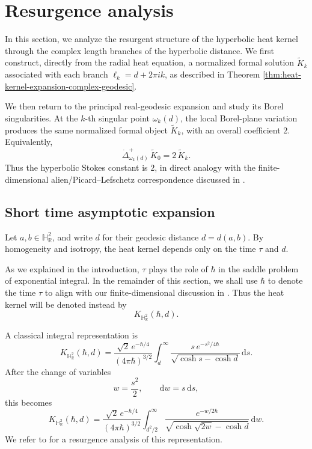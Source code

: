 \documentclass[11pt]{amsart}
\theoremstyle{plain}
\theoremstyle{definition}
\newcommand{\R}{\mathbb{R}}
\newcommand{\dd}{\mathrm d}
\newcommand{\HH}{\mathbb{H}}
\begin{document}
\section{Resurgence analysis}\label{sec:H^2-resurgence}


In this section, we analyze the resurgent structure of the hyperbolic heat kernel
through the complex length branches of the hyperbolic distance.  We first
construct, directly from the radial heat equation, a normalized formal solution
$\widetilde{K}_k$ associated with each branch
$\ell_k=d+2\pi i k$, as described in Theorem \ref{thm:heat-kernel-expansion-complex-geodesic}.  %

We then return to the principal real-geodesic expansion and study its Borel
singularities.  At the $k$-th singular point $\omega_k(d)$, the local Borel-plane
variation produces the same normalized formal object
$\widetilde{K}_k$, with an overall coefficient $2$.  Equivalently,
\[
\dot\Delta_{\omega_k(d)}^{+}\,
\widetilde{K}_0=2\,\widetilde{K}_k.
\]
Thus the hyperbolic Stokes constant is $2$, in direct analogy with the
finite-dimensional alien/Picard--Lefschetz correspondence discussed in
\cite{LiLiTang2026}.


\subsection{Short time asymptotic expansion}

Let $a,b\in\HH_{\R}^{2}$, and write $d$ for their geodesic distance $d=d(a,b)$. By homogeneity and isotropy, the heat kernel depends only on the time $\tau$ and $d$. %

\smallskip
As we explained in the introduction, $\tau$ plays the role of $\hbar$ in the saddle problem of exponential integral. In the remainder of this section, we shall use $\hbar$ to denote the time $\tau$  to align with our finite-dimensional discussion in \cite{LiLiTang2026}. Thus the heat kernel will be denoted instead by 
\[K_{\HH_{\R}^{2}}(\hbar,d).\]

A classical integral representation is
\begin{equation*}\label{eq:H2-heat-kernel-s}
K_{\HH_{\R}^{2}}(\hbar,d)
=\frac{\sqrt{2}\,e^{-\hbar/4}}{(4\pi\hbar)^{3/2}}
\int_{d}^{\infty}
\frac{s\,e^{-s^{2}/4\hbar}}
{\sqrt{\cosh s-\cosh d}}
\,\dd s.
\end{equation*}
After the change of variables
\[
w=\frac{s^{2}}{2},
\qquad
\dd w=s\,\dd s,
\]
this becomes
\begin{equation}\label{eq:H2-heat-kernel-w}
K_{\HH_{\R}^{2}}(\hbar,d)
=\frac{\sqrt{2}\,e^{-\hbar/4}}{(4\pi\hbar)^{3/2}}
\int_{d^{2}/2}^{\infty}
\frac{e^{-w/2\hbar}}
{\sqrt{\cosh\sqrt{2w}-\cosh d}}
\,\dd w.
\end{equation}
We refer to \cite{Du} for a resurgence analysis of this representation.
\end{document}
